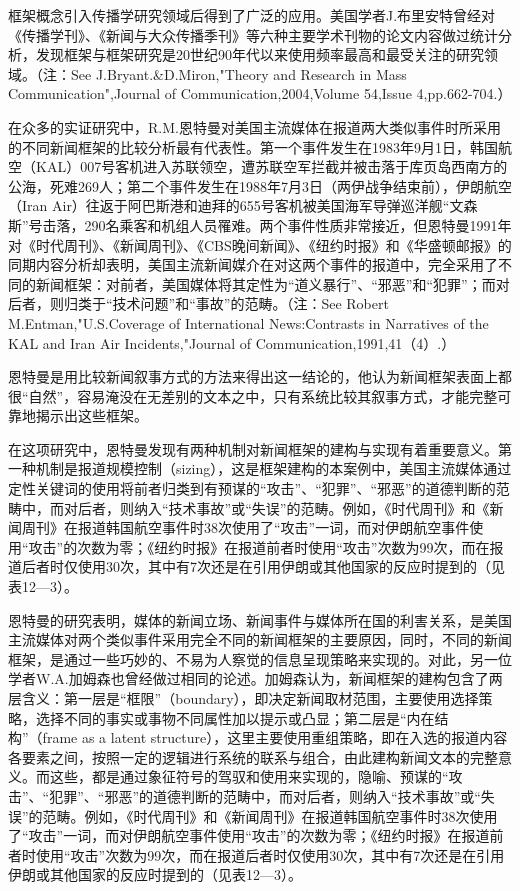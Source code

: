 \documentclass[UTF8,12pt]{ctexart}
\numberwithin{equation}{section} %
\numberwithin{figure}{section}
\numberwithin{table}{section}
\begin{document}
	框架概念引入传播学研究领域后得到了广泛的应用。美国学者J.布里安特曾经对《传播学刊》、《新闻与大众传播季刊》等六种主要学术刊物的论文内容做过统计分析，发现框架与框架研究是20世纪90年代以来使用频率最高和最受关注的研究领域。（注：See J.Bryant.\&D.Miron,"Theory and Research in Mass Communication",Journal of Communication,2004,Volume 54,Issue 4,pp.662-704.）
	
	在众多的实证研究中，R.M.恩特曼对美国主流媒体在报道两大类似事件时所采用的不同新闻框架的比较分析最有代表性。第一个事件发生在1983年9月1日，韩国航空（KAL）007号客机进入苏联领空，遭苏联空军拦截并被击落于库页岛西南方的公海，死难269人；第二个事件发生在1988年7月3日（两伊战争结束前），伊朗航空（Iran Air）往返于阿巴斯港和迪拜的655号客机被美国海军导弹巡洋舰“文森斯”号击落，290名乘客和机组人员罹难。两个事件性质非常接近，但恩特曼1991年对《时代周刊》、《新闻周刊》、《CBS晚间新闻》、《纽约时报》和《华盛顿邮报》的同期内容分析却表明，美国主流新闻媒介在对这两个事件的报道中，完全采用了不同的新闻框架：对前者，美国媒体将其定性为“道义暴行”、“邪恶”和“犯罪”；而对后者，则归类于“技术问题”和“事故”的范畴。（注：See Robert M.Entman,"U.S.Coverage of International News:Contrasts in Narratives of the KAL and Iran Air Incidents,"Journal of Communication,1991,41（4）.）
	
	恩特曼是用比较新闻叙事方式的方法来得出这一结论的，他认为新闻框架表面上都很“自然”，容易淹没在无差别的文本之中，只有系统比较其叙事方式，才能完整可靠地揭示出这些框架。
	
	在这项研究中，恩特曼发现有两种机制对新闻框架的建构与实现有着重要意义。第一种机制是报道规模控制（sizing），这是框架建构的本案例中，美国主流媒体通过定性关键词的使用将前者归类到有预谋的“攻击”、“犯罪”、“邪恶”的道德判断的范畴中，而对后者，则纳入“技术事故”或“失误”的范畴。例如，《时代周刊》和《新闻周刊》在报道韩国航空事件时38次使用了“攻击”一词，而对伊朗航空事件使用“攻击”的次数为零；《纽约时报》在报道前者时使用“攻击”次数为99次，而在报道后者时仅使用30次，其中有7次还是在引用伊朗或其他国家的反应时提到的（见表12—3）。
	
	恩特曼的研究表明，媒体的新闻立场、新闻事件与媒体所在国的利害关系，是美国主流媒体对两个类似事件采用完全不同的新闻框架的主要原因，同时，不同的新闻框架，是通过一些巧妙的、不易为人察觉的信息呈现策略来实现的。对此，另一位学者W.A.加姆森也曾经做过相同的论述。加姆森认为，新闻框架的建构包含了两层含义：第一层是“框限”（boundary），即决定新闻取材范围，主要使用选择策略，选择不同的事实或事物不同属性加以提示或凸显；第二层是“内在结构”（frame as a latent structure），这里主要使用重组策略，即在入选的报道内容各要素之间，按照一定的逻辑进行系统的联系与组合，由此建构新闻文本的完整意义。而这些，都是通过象征符号的驾驭和使用来实现的，隐喻、预谋的“攻击”、“犯罪”、“邪恶”的道德判断的范畴中，而对后者，则纳入“技术事故”或“失误”的范畴。例如，《时代周刊》和《新闻周刊》在报道韩国航空事件时38次使用了“攻击”一词，而对伊朗航空事件使用“攻击”的次数为零；《纽约时报》在报道前者时使用“攻击”次数为99次，而在报道后者时仅使用30次，其中有7次还是在引用伊朗或其他国家的反应时提到的（见表12—3）。
	
\end{document}
